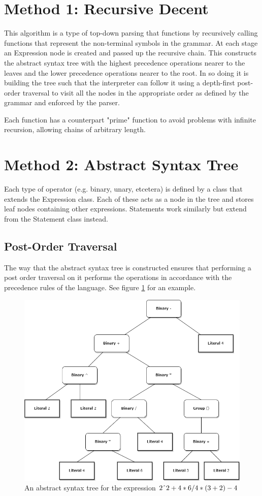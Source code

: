 \documentclass[a4paper, oneside, 11pt]{report}
\begin{document}
\section{Method 1: Recursive Decent}

This algorithm is a type of top-down parsing that functions by recursively calling functions that represent the non-terminal symbols in the grammar.
At each stage an Expression node is created and passed up the recursive chain. This constructs the abstract syntax tree with the highest precedence
operations nearer to the leaves and the lower precedence operations nearer to the root. In so doing it is building the tree such that the interpreter 
can follow it using a depth-first post-order traversal to visit all the nodes in the appropriate order as defined by the grammar and enforced by the parser.

Each function has a counterpart "prime" function to avoid problems with infinite recursion, allowing chains of arbitrary length.

\section{Method 2: Abstract Syntax Tree}

Each type of operator (e.g. binary, unary, etcetera) is defined by a class that extends the Expression class.
Each of these acts as a node in the tree and stores leaf nodes containing other expressions.
Statements work similarly but extend from the Statement class instead.

\subsection{Post-Order Traversal}

The way that the abstract syntax tree is constructed ensures that performing a post order traversal on it performs 
the operations in accordance with the precedence rules of the language. See figure \ref{fig:AST} for an example.
	\begin{figure}[htb]
		\includegraphics[width=1.0 \columnwidth]{AST.png}
		\caption{An abstract syntax tree for  the expression $2 \string^ 2 + 4 * 6 / 4 * (3+2) -4$}
		\label{fig:AST}
	\end{figure}
\end{document}

